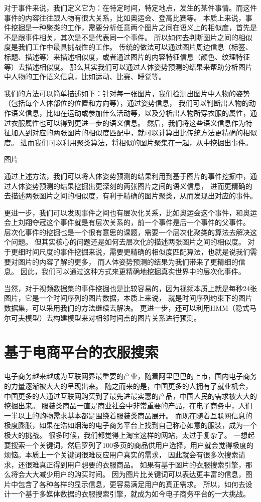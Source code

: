 对于事件来说，我们定义它为：在特定时间，特定地点，发生的某件事情。而这件事件的内容往往跟人物有很大关系，比如奥运会、登高比赛等。
本质上来说，事件挖掘是一种聚类的工作，需要分析任意两个图片之间在语义上的相似度，首先是不是跟事件相关，其次是不是代表同一个事件。
所以如何去判断图片之间的相似度是我们工作中最具挑战性的工作。
传统的做法可以通过图片周边信息（标签、标题、描述等）来描述相似度，或者通过图片的内容特征信息（颜色、纹理特征等）去描述相似度。
那么其实我们可以通过人体姿势预测的结果来帮助分析图片中人物的工作语义信息，比如运动、比赛、睡觉等。

我们的方法可以简单描述如下：针对每一张图片，我们检测出图片中人物的姿势（包括每个人体部位的位置和方向等），通过姿势信息，
我们可以判断出人物的动作语义信息，比如在运动或参加什么活动等，以及分析出人物所穿衣服的属性，通过衣服属性也可以得到更进一步的语义信息。
然后，我们将这些语义信息作为特征加入到对应的两张图片的相似度匹配中，就可以计算出比传统方法更精确的相似度。
进而我们可以利用聚类算法，将相似的图片聚集在一起，从中挖掘出事件。

图片

通过上述方法，我们可以将人体姿势预测的结果利用到基于图片的事件挖掘中，通过人体姿势预测的结果挖掘出更深刻的两张图片之间的语义信息，
进而更精确的去描述两张图片之间的相似度，有利于精确的图片聚类，从而发现出对应的事件。

更进一步，我们可以发现事件之间也有层次化关系，比如奥运会这个事件，和奥运会上刘翔夺冠这个事件就是有层次关系的，前一个事件是后一个事件的父事件。
层次化事件的挖掘也是一个很有意思的课题，需要一个层次化聚类的算法去解决这个问题。
但其实核心的问题还是如何去层次化的描述两张图片之间的相似度。
对于更细时间尺度的事件挖掘来说，需要更精确的相似度匹配算法，也就是说我们需要对图片的内容了解的更多，
而人体姿势预测的结果为我们带来了更精细的信息。
因此，我们可以通过这种方式来更精确地挖掘真实世界中的层次化事件。

当然，对于视频数据集的事件挖掘也是比较容易的，因为视频本质上就是每秒24张图片，它是一个时间序列的图片数据，本质上来说，
就是时间序列约束下的图片数据集，可以采用我们的方法继续去解决。
更进一步，还可以利用HMM（隐式马尔可夫模型）去构建模型来对相邻时间点的图片关系进行预测。


\section{基于电商平台的衣服搜索}
电子商务越来越成为互联网界最重要的产业，随着阿里巴巴的上市，国内电子商务的力量逐渐被大大的呈现出来。
随之而来的是，中国更多的人拥有了就业机会，中国更多的人通过互联网购买到了最先进最实惠的产品，中国人民的需求被大大的挖掘出来。
服装类商品一直是商业社会中非常重要的产品，在电子商务中，人们一半以上的购物需求基本都是围绕着服装类商品展开。
而现在随着互联网信息的极度膨胀，如果在浩如烟海的电子商务平台上找到自己称心如意的服装，成为一个极大的挑战。
很多时候，我们都觉得上淘宝这样的网站，太过于复杂了。
一想起要搜索一个关键词，然后罗列了100多页的商品供用户选择，用户就会觉得极度的烦恼。本质上一个关键词很难反应用户真实的需求，
因此就会有很多次搜索请求，还很难真正得到用户想要的衣服商品。
如果有基于图片的衣服搜索引擎，那么将会大大减少用户的购买时间。
因为图片比关键词可以表达更丰富的信息，图片中包含了各种各样的显示信息，更容易满足用户的真正需求。
所以，如何去设计一个基于多媒体数据的衣服搜索引擎，就成为如今电子商务平台的一大挑战。

